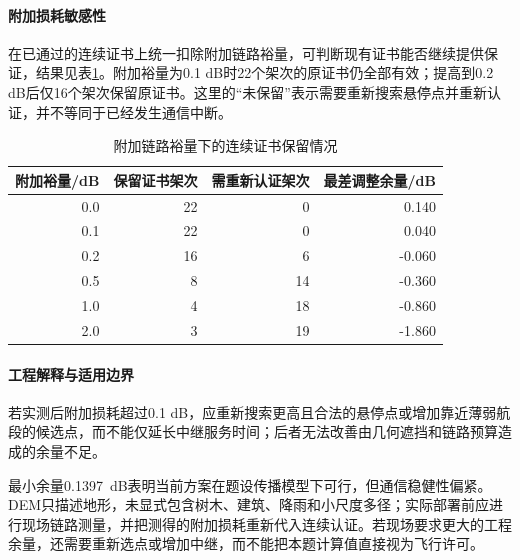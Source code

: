 \paragraph{附加损耗敏感性}
在已通过的连续证书上统一扣除附加链路裕量，可判断现有证书能否继续提供保证，结果见表\ref{tab:q3-margin}。附加裕量为0.1 dB时22个架次的原证书仍全部有效；提高到0.2 dB后仅16个架次保留原证书。这里的“未保留”表示需要重新搜索悬停点并重新认证，并不等同于已经发生通信中断。
\begin{table}[htbp]
  \centering
  \caption{附加链路裕量下的连续证书保留情况}
  \label{tab:q3-margin}
  \begin{tabular}{rrrr}
    \toprule
    附加裕量/dB & 保留证书架次 & 需重新认证架次 & 最差调整余量/dB \\
    \midrule
    0.0 & 22 & 0  &  0.140 \\
    0.1 & 22 & 0  &  0.040 \\
    0.2 & 16 & 6  & -0.060 \\
    0.5 & 8  & 14 & -0.360 \\
    1.0 & 4  & 18 & -0.860 \\
    2.0 & 3  & 19 & -1.860 \\
    \bottomrule
  \end{tabular}
\end{table}

\paragraph{工程解释与适用边界}
若实测后附加损耗超过0.1 dB，应重新搜索更高且合法的悬停点或增加靠近薄弱航段的候选点，而不能仅延长中继服务时间；后者无法改善由几何遮挡和链路预算造成的余量不足。

最小余量0.1397~dB表明当前方案在题设传播模型下可行，但通信稳健性偏紧。DEM只描述地形，未显式包含树木、建筑、降雨和小尺度多径；实际部署前应进行现场链路测量，并把测得的附加损耗重新代入连续认证。若现场要求更大的工程余量，还需要重新选点或增加中继，而不能把本题计算值直接视为飞行许可。
